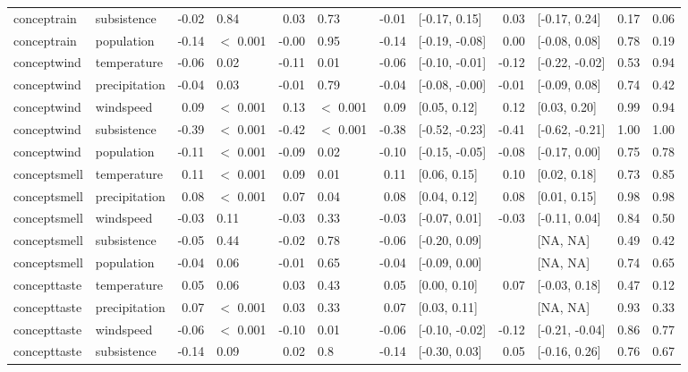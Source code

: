 \begin{table}[ht]
\begin{tabular}{llrlrlrlrlrr}
  conceptrain & subsistence & -0.02 & 0.84 & 0.03 & 0.73 & -0.01 & [-0.17, 0.15] & 0.03 & [-0.17, 0.24] & 0.17 & 0.06 \\ 
  conceptrain & population & -0.14 & $<$ 0.001 & -0.00 & 0.95 & -0.14 & [-0.19, -0.08] & 0.00 & [-0.08, 0.08] & 0.78 & 0.19 \\ 
  conceptwind & temperature & -0.06 & 0.02 & -0.11 & 0.01 & -0.06 & [-0.10, -0.01] & -0.12 & [-0.22, -0.02] & 0.53 & 0.94 \\ 
  conceptwind & precipitation & -0.04 & 0.03 & -0.01 & 0.79 & -0.04 & [-0.08, -0.00] & -0.01 & [-0.09, 0.08] & 0.74 & 0.42 \\ 
  conceptwind & windspeed & 0.09 & $<$ 0.001 & 0.13 & $<$ 0.001 & 0.09 & [0.05, 0.12] & 0.12 & [0.03, 0.20] & 0.99 & 0.94 \\ 
  conceptwind & subsistence & -0.39 & $<$ 0.001 & -0.42 & $<$ 0.001 & -0.38 & [-0.52, -0.23] & -0.41 & [-0.62, -0.21] & 1.00 & 1.00 \\ 
  conceptwind & population & -0.11 & $<$ 0.001 & -0.09 & 0.02 & -0.10 & [-0.15, -0.05] & -0.08 & [-0.17, 0.00] & 0.75 & 0.78 \\ 
  conceptsmell & temperature & 0.11 & $<$ 0.001 & 0.09 & 0.01 & 0.11 & [0.06, 0.15] & 0.10 & [0.02, 0.18] & 0.73 & 0.85 \\ 
  conceptsmell & precipitation & 0.08 & $<$ 0.001 & 0.07 & 0.04 & 0.08 & [0.04, 0.12] & 0.08 & [0.01, 0.15] & 0.98 & 0.98 \\ 
  conceptsmell & windspeed & -0.03 & 0.11 & -0.03 & 0.33 & -0.03 & [-0.07, 0.01] & -0.03 & [-0.11, 0.04] & 0.84 & 0.50 \\ 
  conceptsmell & subsistence & -0.05 & 0.44 & -0.02 & 0.78 & -0.06 & [-0.20, 0.09] &  & [NA, NA] & 0.49 & 0.42 \\ 
  conceptsmell & population & -0.04 & 0.06 & -0.01 & 0.65 & -0.04 & [-0.09, 0.00] &  & [NA, NA] & 0.74 & 0.65 \\ 
  concepttaste & temperature & 0.05 & 0.06 & 0.03 & 0.43 & 0.05 & [0.00, 0.10] & 0.07 & [-0.03, 0.18] & 0.47 & 0.12 \\ 
  concepttaste & precipitation & 0.07 & $<$ 0.001 & 0.03 & 0.33 & 0.07 & [0.03, 0.11] &  & [NA, NA] & 0.93 & 0.33 \\ 
  concepttaste & windspeed & -0.06 & $<$ 0.001 & -0.10 & 0.01 & -0.06 & [-0.10, -0.02] & -0.12 & [-0.21, -0.04] & 0.86 & 0.77 \\ 
  concepttaste & subsistence & -0.14 & 0.09 & 0.02 & 0.8 & -0.14 & [-0.30, 0.03] & 0.05 & [-0.16, 0.26] & 0.76 & 0.67 \\ 

\end{tabular}
\end{table}
